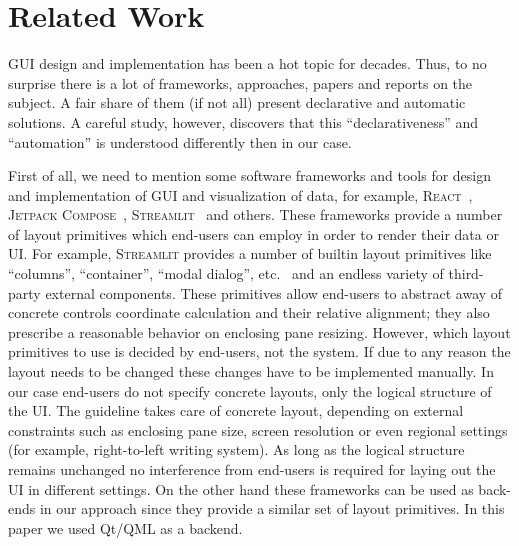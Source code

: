 
\section{Related Work}
\label{related}

GUI design and implementation has been a hot topic for decades. Thus, to no surprise there is a lot of frameworks, approaches, papers
and reports on the subject. A fair share of them (if not all) present declarative and automatic solutions. A careful study, however,
discovers that this ``declarativeness'' and ``automation'' is understood differently then in our case.

First of all, we need to mention some software frameworks and tools for design and implementation of GUI and visualization of data, for example, \textsc{React}~\cite{react},
\textsc{Jetpack Compose}~\cite{Jetpack},%
\textsc{Streamlit}~\cite{Streamlit}%
and others.
These frameworks provide a number of layout primitives which end-users can employ in order to render their data or UI. For example, \textsc{Streamlit}
provides a number of builtin layout primitives like ``columns'', ``container'', ``modal dialog'', etc.~\cite{StreamlitLayout} and an endless
variety of third-party external components. These primitives allow end-users to abstract away of concrete controls coordinate calculation and their
relative alignment; they also prescribe a reasonable behavior on enclosing pane resizing. However, which layout primitives to use is decided by
end-users, not the system. If due to any reason the layout needs to be changed these changes have to be implemented manually. In our case
end-users do not specify concrete layouts, only the logical structure of the UI. The guideline takes care of concrete layout, depending on
external constraints such as enclosing pane size, screen resolution or even regional settings (for example, right-to-left writing system). As long
as the logical structure remains unchanged no interference from end-users is required for laying out the UI in different settings. On the
other hand these frameworks can be used as back-ends in our approach since they provide a similar set of layout primitives.
In this paper we used Qt/QML as a backend.

